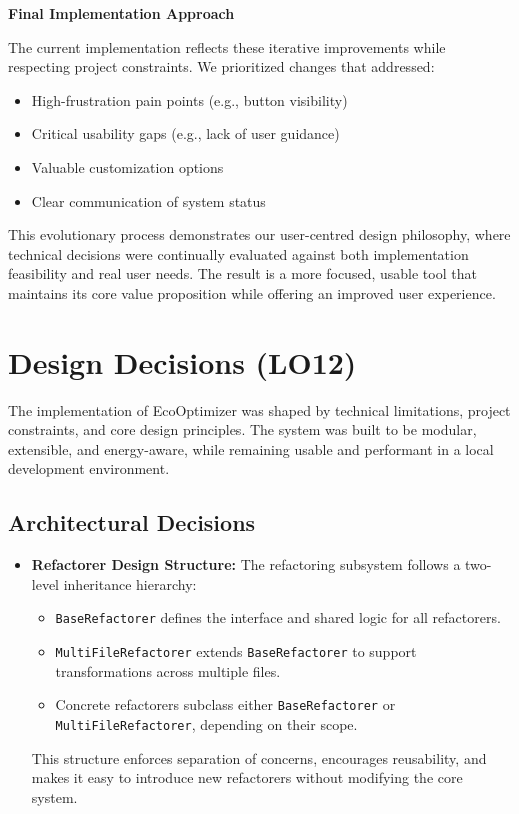 \documentclass{article}
\begin{document}
\noindent \textbf{Final Implementation Approach}

\noindent
The current implementation reflects these iterative improvements while respecting project constraints. We prioritized changes that addressed:
\begin{itemize}
    \item High-frustration pain points (e.g., button visibility)
    \item Critical usability gaps (e.g., lack of user guidance)
    \item Valuable customization options
    \item Clear communication of system status
\end{itemize}

This evolutionary process demonstrates our user-centred design philosophy, where technical decisions were continually evaluated against both implementation feasibility and real user needs. The result is a more focused, usable tool that maintains its core value proposition while offering an improved user experience.


\section{Design Decisions (LO12)}

The implementation of EcoOptimizer was shaped by technical limitations, project constraints, and core design principles. The system was built to be modular, extensible, and energy-aware, while remaining usable and performant in a local development environment.

\subsection*{Architectural Decisions}

\begin{itemize}
    \item \textbf{Refactorer Design Structure:} The refactoring subsystem follows a two-level inheritance hierarchy:
    \begin{itemize}
        \item \texttt{BaseRefactorer} defines the interface and shared logic for all refactorers.
        \item \texttt{MultiFileRefactorer} extends \texttt{BaseRefactorer} to support transformations across multiple files.
        \item Concrete refactorers subclass either \texttt{BaseRefactorer} or \texttt{MultiFileRefactorer}, depending on their scope.
    \end{itemize}
    This structure enforces separation of concerns, encourages reusability, and makes it easy to introduce new refactorers without modifying the core system.
\end{itemize}
\end{document}
